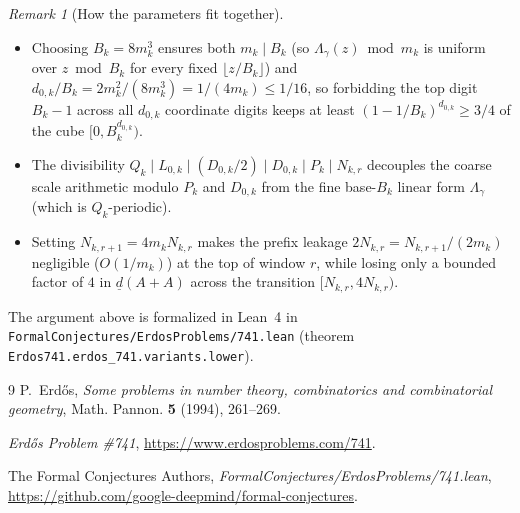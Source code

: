 \documentclass[11pt,a4paper]{amsart}
\theoremstyle{remark}
\newtheorem*{remark}{Remark}
\newcommand{\ld}{\underline{d}}
\begin{document}
\begin{remark}[How the parameters fit together]
\begin{itemize}
\item Choosing $B_k = 8 m_k^3$ ensures both $m_k \mid B_k$ (so $\Lambda_\gamma(z) \bmod m_k$ is uniform over $z \bmod B_k$ for every fixed $\lfloor z / B_k \rfloor$) and $d_{0,k} / B_k = 2 m_k^2 / (8 m_k^3) = 1 / (4 m_k) \le 1 / 16$, so forbidding the top digit $B_k - 1$ across all $d_{0,k}$ coordinate digits keeps at least $(1 - 1 / B_k)^{d_{0,k}} \ge 3 / 4$ of the cube $[0, B_k^{d_{0,k}})$.
\item The divisibility $Q_k \mid L_{0,k} \mid (D_{0,k} / 2) \mid D_{0,k} \mid P_k \mid N_{k,r}$ decouples the coarse scale arithmetic modulo $P_k$ and $D_{0,k}$ from the fine base-$B_k$ linear form $\Lambda_\gamma$ (which is $Q_k$-periodic).
\item Setting $N_{k,r+1} = 4 m_k N_{k,r}$ makes the prefix leakage $2 N_{k,r} = N_{k,r+1} / (2 m_k)$ negligible ($O(1/m_k)$) at the top of window $r$, while losing only a bounded factor of $4$ in $\ld(A + A)$ across the transition $[N_{k,r}, 4 N_{k,r})$.
\end{itemize}
The argument above is formalized in Lean~4 in \nolinkurl{FormalConjectures/ErdosProblems/741.lean} (theorem \texttt{Erdos741.erdos\_741.variants.lower}).
\end{remark}

\begin{thebibliography}{9}
P.~Erd\H{o}s, \emph{Some problems in number theory, combinatorics and combinatorial geometry}, Math. Pannon. \textbf{5} (1994), 261--269.

\emph{Erd\H{o}s Problem \#741}, \url{https://www.erdosproblems.com/741}.

The Formal Conjectures Authors, \emph{FormalConjectures/ErdosProblems/741.lean},\\ \url{https://github.com/google-deepmind/formal-conjectures}.
\end{thebibliography}
\end{document}
